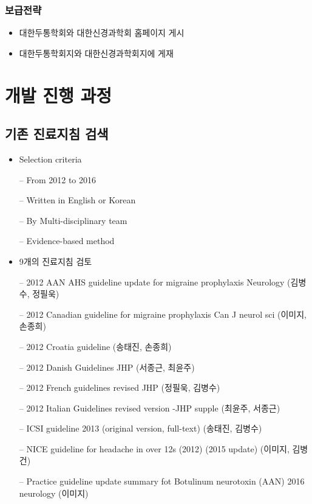 \documentclass[]{book}
\providecommand{\tightlist}{%
  \setlength{\itemsep}{0pt}\setlength{\parskip}{0pt}}
\begin{document}
\hypertarget{section-38}{%
\subsection*{보급전략}\label{section-38}}

\begin{itemize}
\tightlist
\item
  대한두통학회와 대한신경과학회 홈페이지 게시
\item
  대한두통학회지와 대한신경과학회지에 게재
\end{itemize}

\hypertarget{section-39}{%
\chapter{개발 진행 과정}\label{section-39}}

\hypertarget{section-40}{%
\section*{기존 진료지침 검색}\label{section-40}}

\begin{itemize}
\item
  Selection criteria

  -- From 2012 to 2016

  -- Written in English or Korean

  -- By Multi-disciplinary team

  -- Evidence-based method
\item
  9개의 진료지침 검토

  -- 2012 AAN AHS guideline update for migraine prophylaxis Neurology (김병수, 정필욱)

  -- 2012 Canadian guideline for migraine prophylaxis Can J neurol sci (이미지, 손종희)

  -- 2012 Croatia guideline (송태진, 손종희)

  -- 2012 Danish Guidelines JHP (서종근, 최윤주)

  -- 2012 French guidelines revised JHP (정필욱, 김병수)

  -- 2012 Italian Guidelines revised version -JHP supple (최윤주, 서종근)

  -- ICSI guideline 2013 (original version, full-text) (송태진, 김병수)

  -- NICE guideline for headache in over 12s (2012) (2015 update) (이미지, 김병건)

  -- Practice guideline update summary fot Botulinum neurotoxin (AAN) 2016 neurology (이미지)
\end{itemize}
\end{document}
